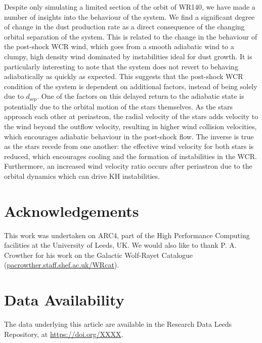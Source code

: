 \documentclass[fleqn,usenatbib]{mnras}
\newcommand{\rms}[1]{\ensuremath{_{\text{#1}}}}
\begin{document}
Despite only simulating a limited section of the orbit of WR140, we have made a number of insights into the behaviour of the system.
We find a significant degree of change in the dust production rate as a direct consequence of the changing orbital separation of the system.
This is related to the change in the behaviour of the post-shock WCR wind, which goes from a smooth adiabatic wind to a clumpy, high density wind dominated by instabilities ideal for dust growth.
It is particularly interesting to note that the system does not revert to behaving adiabatically as quickly as expected.
This suggests that the post-shock WCR condition of the system is dependent on additional factors, instead of being solely due to $d\rms{sep}$.
One of the factors on this delayed return to the adiabatic state is potentially due to the orbital motion of the stars themselves.
As the stars approach each other at periastron, the radial velocity of the stars adds velocity to the wind beyond the outflow velocity, resulting in higher wind collision velocities, which encourages adiabatic behaviour in the post-shock flow.
The inverse is true as the stars recede from one another: the effective wind velocity for both stars is reduced, which encourages cooling and the formation of instabilities in the WCR.
Furthermore, an increased wind velocity ratio occurs after periastron due to the orbital dynamics which can drive KH instabilities.


\section*{Acknowledgements}

This work was undertaken on ARC4, part of the High Performance Computing facilities at the University of Leeds, UK.
We would also like to thank P. A. Crowther for his work on the Galactic Wolf-Rayet Catalogue (\url{pacrowther.staff.shef.ac.uk/WRcat}).

\section*{Data Availability}
The data underlying this article are available in the Research Data Leeds Repository, at \url{https://doi.org/XXXX}.





\bsp	%
\label{lastpage}
\end{document}
